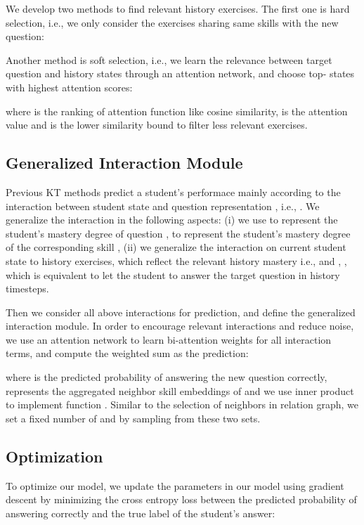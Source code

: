 \documentclass[runningheads]{llncs}
\begin{document}
We develop two methods to find relevant history exercises. The first one is hard selection, i.e., we only consider the exercises sharing same skills with the new question:
	

Another method is soft selection, i.e., we learn the relevance between target question and history states through an attention network, and choose top- states with highest attention scores:

where  is the ranking of attention function  like cosine similarity,  is the attention value and  is the lower similarity bound to filter less relevant exercises. 







\subsection{Generalized Interaction Module}

Previous KT methods predict a student's performace mainly according to the interaction between student state  and question representation , i.e., . We generalize the interaction in the following aspects: (i) we use  to represent the student's mastery degree of question ,  to represent the student's mastery degree of the corresponding skill , (ii) we generalize the interaction on current student state to history exercises, which 
reflect the relevant history mastery i.e.,  and , , which is equivalent to let the student to answer the target question in history timesteps.

Then we consider all above interactions for prediction, and define the generalized interaction module. In order to encourage relevant interactions and reduce noise, we use an attention network to learn bi-attention weights for all interaction terms, and compute the weighted sum as the prediction:


where  is the predicted probability of answering the new question correctly,  represents the aggregated neighbor skill embeddings of   and we use inner product to implement function . Similar to the selection of neighbors in relation graph, we set a fixed number of  and  by sampling from these two sets.


\subsection{Optimization}
To optimize our model, we update the parameters in our model using gradient descent by minimizing the cross entropy loss between the predicted probability of answering correctly and the true label of the student's answer:
\end{document}
